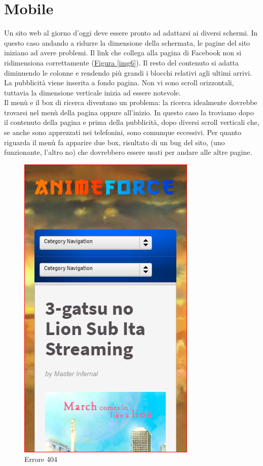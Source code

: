 \section{Mobile}
Un sito web al giorno d'oggi deve essere pronto ad adattarsi ai diversi schermi. In questo caso andando a ridurre la dimensione della schermata, le pagine del sito iniziano ad avere problemi. Il link che collega alla pagina di Facebook non si ridimensiona correttamente (\hyperref[img6]{Figura \ref{img6}}). Il resto del contenuto si adatta diminuendo le colonne e rendendo più grandi i blocchi relativi agli ultimi arrivi. La pubblicità viene inserita a fondo pagina. Non vi sono scroll orizzontali, tuttavia la dimensione verticale inizia ad essere notevole. \\
Il menù e il box di ricerca diventano un problema: la ricerca idealmente dovrebbe trovarsi nel menù della pagina oppure all'inizio. In questo caso la troviamo dopo il contenuto della pagina e prima della pubblicità, dopo diversi scroll verticali che, se anche sono apprezzati nei telefonini, sono comunque eccessivi. Per quanto riguarda il menù fa apparire due box, risultato di un bug del sito, (uno funzionante, l'altro no) che dovrebbero essere usati per andare alle altre pagine.

\begin{figure}[H]
	\centering
	\includegraphics[height=0.5\textwidth]{img/Mobile.png}
	\caption{Errore 404} 
	\label{Mobile} 
\end{figure}